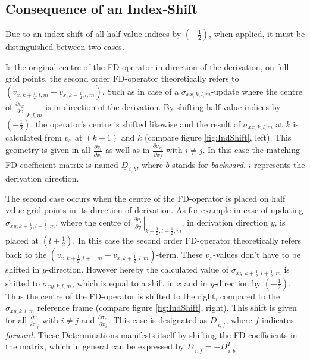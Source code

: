 \documentclass[pdftex,a4paper,parskip,listof=totoc,bibliography=totoc,onehalfspacing,12pt]{scrreprt}
\begin{document}
\subsection{Consequence of an Index-Shift}

Due to an index-shift of all half value indices by $(-\frac{1}{2})$, when applied, it must be distinguished between two cases. 

Is the original centre of the FD-operator in direction of the derivation, on full grid points, the second order FD-operator theoretically refers to $\left(v_{x,k+\frac{1}{2},l,m} - v_{x,k-\frac{1}{2},l,m}\right)$. Such as in case of a $\sigma_{xx,k,l,m}$-update where the centre of $\left. \frac{\partial v_x}{\partial x} \right\rvert_{k,l,m}$ is in direction of the derivation. By shifting half value indices by $(-\frac{1}{2})$, the operator's centre is shifted likewise and the result of $\sigma_{xx,k,l,m}$ at $k$ is calculated from $v_x$ at $(k-1)$ and $k$ (compare figure \ref{fig:IndShift}, left). This geometry is given in all $\frac{\partial v_i}{\partial x_i}$ as well as in $\frac{\partial \sigma_{ij}}{\partial x_j}$ with $i\neq j$. In this case the matching FD-coefficient matrix  is named $\underline{D}_{\,i,b}$, where $b$ stands for \textit{backward}. $i$ represents the derivation direction.

The second case occurs when the centre of the FD-operator is placed on half value grid points in its direction of derivation. As for example in case of  updating $\sigma_{xy,k+\frac{1}{2},l+\frac{1}{2},m}$, where the centre of $\left. \frac{\partial v_x}{\partial y} \right\rvert_{k+\frac{1}{2},l+\frac{1}{2},m}$, in derivation direction $y$, is placed at $(l+\frac{1}{2})$. In this case the second order FD-operator theoretically refers back to the $\left(v_{x,k+\frac{1}{2},l+1,m} - v_{x,k+\frac{1}{2},l,m}\right)$-term. These $v_x$-values don't have to be shifted in $y$-direction. However hereby the calculated value of $\sigma_{xy,k+\frac{1}{2},l+\frac{1}{2},m}$ is shifted to $\sigma_{xy,k,l,m}$, which is equal to a shift in $x$ and in $y$-direction by $(-\frac{1}{2})$. Thus the centre of the FD-operator is shifted to the right, compared to the $\sigma_{xy,k,l,m}$ reference frame (compare figure \ref{fig:IndShift}, right). This shift is given for all $\frac{\partial v_i}{\partial x_j}$ with $i\neq j$ and $\frac{\partial \sigma_{ii}}{\partial x_i}$. This case is designated as $\underline{D}_{\,i,f}$, where $f$ indicates \textit{forward}.
These Determinations manifests itself by shifting the FD-coefficients in the matrix, which in general can be expressed by $\underline{D}_{\,i,f} = -\underline{D}_{\,i,b}^T$.
\end{document}
